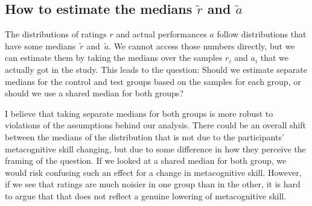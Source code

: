 \documentclass[10pt, twoside,a4paper]{article}
\begin{document}
\newpage
\subsection{How to estimate the medians $\tilde{r}$ and $\tilde{a}$}
The distributions of ratings $r$ and actual performances $a$ follow distributions that have some medians~$\tilde{r}$ and~$\tilde{a}$. We cannot access those numbers directly, but we can estimate them by taking the medians over the samples $r_i$ and $a_i$ that we actually got in the study. This leads to the question: Should we estimate separate medians for the control and test groups based on the samples for each group, or should we use a shared median for both groups?

I believe that taking separate medians for both groups is more robust to violations of the assumptions behind our analysis. There could be an overall shift between the medians of the distribution that is not due to the participants' metacognitive skill changing, but due to some difference in how they perceive the framing of the question. If we looked at a shared median for both group, we would risk confusing such an effect for a change in metacognitive skill. However, if we see that ratings are much noisier in one group than in the other, it is hard to argue that that does not reflect a genuine lowering of metacognitive skill.






\newpage
\end{document}
